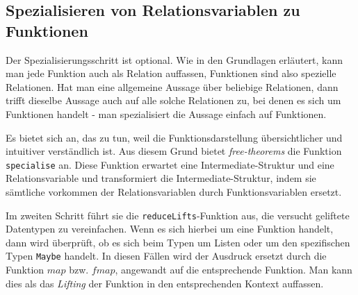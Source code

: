 
%
%
%
%


\subsection{Spezialisieren von Relationsvariablen zu Funktionen}

\label{sec:specialise-relvars}

Der Spezialisierungsschritt ist optional. Wie in den Grundlagen erläutert, kann man jede Funktion auch als Relation auffassen,
Funktionen sind also spezielle Relationen. Hat man eine allgemeine Aussage über beliebige Relationen, dann trifft dieselbe
Aussage auch auf alle solche Relationen zu, bei denen es sich um Funktionen handelt - man spezialisiert die Aussage einfach
auf Funktionen.

Es bietet sich an, das zu tun, weil die Funktionsdarstellung übersichtlicher und intuitiver verständlich ist. Aus diesem Grund
bietet \textit{free-theorems} die Funktion \texttt{specialise} an. Diese Funktion erwartet eine Intermediate-Struktur und
eine Relationsvariable und transformiert die Intermediate-Struktur, indem sie sämtliche vorkommen der Relationsvariablen
durch Funktionsvariablen ersetzt.

Im zweiten Schritt führt sie die \texttt{reduceLifts}-Funktion aus, die versucht geliftete Datentypen zu vereinfachen.
 Wenn es sich hierbei um eine Funktion handelt, dann wird überprüft, ob es sich beim Typen
um Listen oder um den spezifischen Typen \texttt{Maybe} handelt. In diesen Fällen wird der Ausdruck ersetzt durch die
Funktion $map$ bzw. $fmap$, angewandt auf die entsprechende Funktion. Man kann dies als das \textit{Lifting} der Funktion
in den entsprechenden Kontext auffassen.

